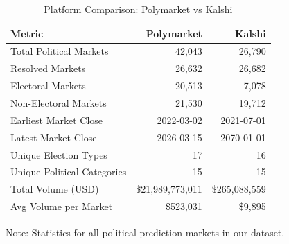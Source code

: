 \begin{table}[htbp]
\centering
\caption{Platform Comparison: Polymarket vs Kalshi}
\label{tab:platform_comparison}
\begin{tabular}{lrr}
\toprule
Metric & Polymarket & Kalshi \\
\midrule
Total Political Markets & 42,043 & 26,790 \\
Resolved Markets & 26,632 & 26,682 \\
Electoral Markets & 20,513 & 7,078 \\
Non-Electoral Markets & 21,530 & 19,712 \\
Earliest Market Close & 2022-03-02 & 2021-07-01 \\
Latest Market Close & 2026-03-15 & 2070-01-01 \\
Unique Election Types & 17 & 16 \\
Unique Political Categories & 15 & 15 \\
Total Volume (USD) & \$21,989,773,011 & \$265,088,559 \\
Avg Volume per Market & \$523,031 & \$9,895 \\
\bottomrule
\end{tabular}
\begin{tablenotes}
\small
\item Note: Statistics for all political prediction markets in our dataset.
\end{tablenotes}
\end{table}
